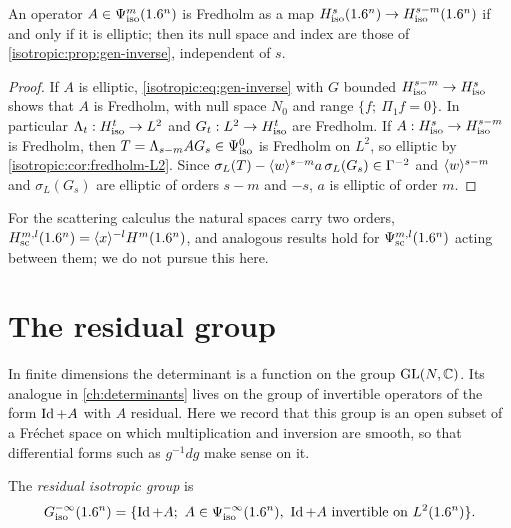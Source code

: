 \begin{proposition}\label{isotropic:prop:Hiso-fredholm}
An operator $A\in\Psi^{m}_{\mathrm{iso}}(1.6^n)$ is Fredholm as a map
$H^{s}_{\mathrm{iso}}(1.6^n)\to H^{s-m}_{\mathrm{iso}}(1.6^n)$ if and only if it is elliptic; then its null
space and index are those of \cref{isotropic:prop:gen-inverse}, independent of $s$.
\end{proposition}
\begin{proof}
If $A$ is elliptic, \eqref{isotropic:eq:gen-inverse} with $G$ bounded
$H^{s-m}_{\mathrm{iso}}\to H^{s}_{\mathrm{iso}}$ shows that $A$ is Fredholm, with null space $N_0$ and
range $\{f;\ \Pi_1f=0\}$. In particular $\Lambda_t:H^{t}_{\mathrm{iso}}\to L^2$ and
$G_t:L^2\to H^{t}_{\mathrm{iso}}$ are Fredholm. If $A:H^{s}_{\mathrm{iso}}\to H^{s-m}_{\mathrm{iso}}$ is Fredholm,
then $T=\Lambda_{s-m}AG_s\in\Psi^{0}_{\mathrm{iso}}$ is Fredholm on $L^2$, so elliptic by
\cref{isotropic:cor:fredholm-L2}. Since $\sigma_L(T)-\langle w\rangle^{s-m}a\,\sigma_L(G_s)\in\Gamma^{-2}$
and $\langle w\rangle^{s-m}$ and $\sigma_L(G_s)$ are elliptic of orders $s-m$ and $-s$, $a$
is elliptic of order $m$.
\end{proof}

\begin{remark}\label{isotropic:rem:Hsc}
For the scattering calculus the natural spaces carry two orders,
$H^{m,l}_{\mathrm{sc}}(1.6^n)=\langle x\rangle^{-l}H^m(1.6^n)$, and analogous results hold
for $\Psi^{m,l}_{\mathrm{sc}}(1.6^n)$ acting between them; we do not pursue this here.
\end{remark}

\section{The residual group}\label{isotropic:sec:group}

In finite dimensions the determinant is a function on the group
$\operatorname{GL}(N,\mathbb{C})$. Its analogue in \cref{ch:determinants} lives on the group of
invertible operators of the form $\operatorname{Id}+A$ with $A$ residual. Here we record
that this group is an open subset of a Fr\'echet space on which
multiplication and inversion are smooth, so that differential forms such as
$g^{-1}dg$ make sense on it.

\begin{definition}\label{isotropic:def:group}
The \emph{residual isotropic group} is
\begin{equation*}
  \Gres(\R^n)=\{\Id+A;\ A\in\Psiiso{-\infty}(\R^n),\ \Id+A\text{ invertible on }L^2(\R^n)\}.
\end{equation*}
\end{definition}

